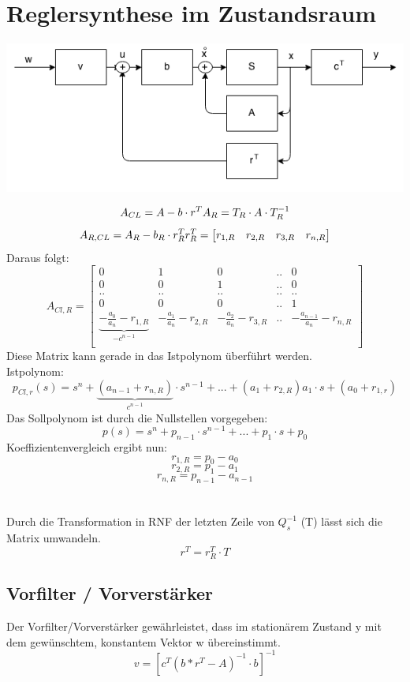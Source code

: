 \section{Reglersynthese im Zustandsraum}
\begin{center}
	\includegraphics[scale = 0.4]{images/zustandsregler.png}
\end{center}
\[
	A_{CL}= A-b\cdot r^T	\\ A_R=T_R\cdot A \cdot T_R^{-1}
\]
\[
	A_{R,CL}= A_R-b_R\cdot r_R^T	\\	r_R^T=
		\begin{bmatrix}
				r_{1,R}	&	r_{2,R}	& r_{3,R} &r_{n,R}\\
		\end{bmatrix}
\]
Daraus folgt:
\[
		A_{Cl,R}=
		\begin{bmatrix}
			0 &	1 & 0 & .. & 0\\
			0 & 0 & 1 & .. & 0\\
			.. & .. & .. &.. & .. \\
			0 & 0 & 0 & .. & 1\\
				\underbrace{
					-\frac{a_0}{a_n}-r_{1,R} 
				}_{\textbf{$-c^{n-1}$}}
		 &-\frac{a_1}{a_n}-r_{2,R} & -\frac{a_2}{a_n}-r_{3,R} &.. &-\frac{a_{n-1}}{a_n}-r_{n,R}\\	
		\end{bmatrix}
\]
Diese Matrix kann gerade in das Istpolynom überführt werden.
\\
Istpolynom:
\[
	p_{Cl,r}(s)=s^n+
	\underbrace{(a_{n-1}+r_{n,R})	}_{\textbf{$c^{n-1}$}}
	\cdot s^{n-1}+...+(a_{1}+r_{2,R})a_1\cdot s +(a_0+r_{1,r})
\]
Das Sollpolynom ist durch die Nullstellen vorgegeben:
\[
	p(s)=s^n+p_{n-1}\cdot s^{n-1}+...+p_1\cdot s +p_0
\]
Koeffizientenvergleich ergibt nun:
\[
	r_{1,R}=p_0-a_0
\]
\[
	r_{2,R}=p_1-a_1
\]
\[
	r_{n,R}=p_{n-1}-a_{n-1}
\]
\\
\\
Durch die Transformation in RNF der letzten Zeile von $Q_s^{-1}$ (T) lässt sich die Matrix umwandeln.
\[
	r^T=r_R^T \cdot T
\]


\subsection{Vorfilter / Vorverstärker}
Der Vorfilter/Vorverstärker gewährleistet, dass im stationärem Zustand y mit dem gewünschtem, konstantem Vektor w übereinstimmt.
\[
	 	v=[c^T(b*r^T-A)^{-1}\cdot b]^{-1}
\]
\\
